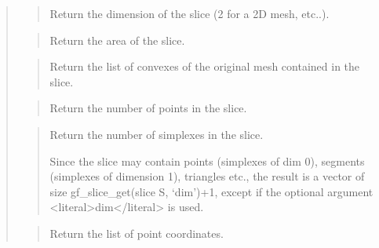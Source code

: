 \documentclass[a4paper,11pt,english]{sphinxmanual}
\begin{document}
\sphinxAtStartPar
{}
\begin{quote}

\sphinxAtStartPar
{}
\begin{quote}

\sphinxAtStartPar
Return the dimension of the slice (2 for a 2D mesh, etc..).
\end{quote}

\sphinxAtStartPar
{}
\begin{quote}

\sphinxAtStartPar
Return the area of the slice.
\end{quote}

\sphinxAtStartPar
{}
\begin{quote}

\sphinxAtStartPar
Return the list of convexes of the original mesh contained in the slice.
\end{quote}

\sphinxAtStartPar
{}
\begin{quote}

\sphinxAtStartPar
Return the number of points in the slice.
\end{quote}

\sphinxAtStartPar
{}
\begin{quote}

\sphinxAtStartPar
Return the number of simplexes in the slice.

\sphinxAtStartPar
Since the slice may contain points (simplexes of dim 0), segments
(simplexes of dimension 1), triangles etc., the result is a vector
of size gf\_slice\_get(slice S, ‘dim’)+1, except if the optional argument \textless{}literal\textgreater{}dim\textless{}/literal\textgreater{}
is used.
\end{quote}

\sphinxAtStartPar
{}
\begin{quote}

\sphinxAtStartPar
Return the list of point coordinates.
\end{quote}


\end{quote}
\end{document}
